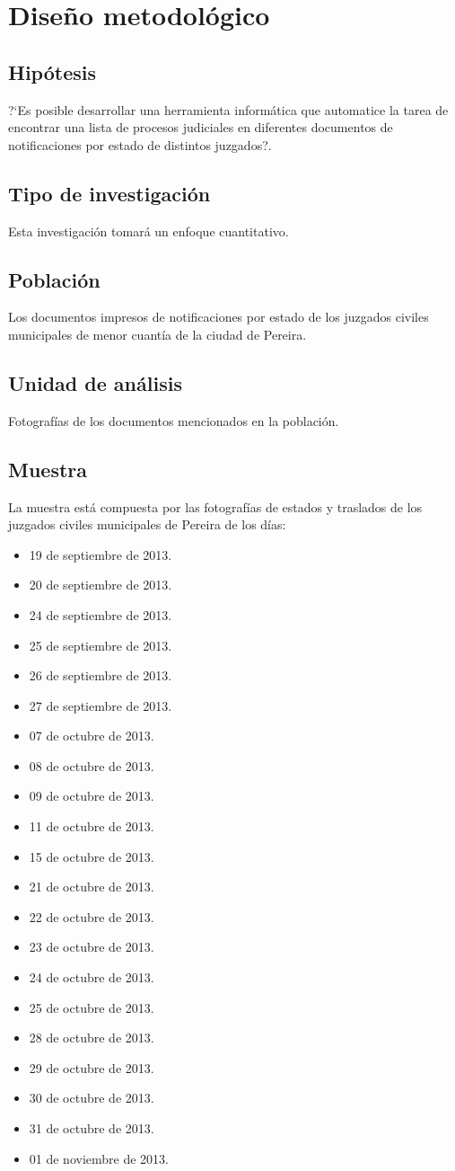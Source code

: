 \chapter{Dise\~no metodol\'ogico}
\label{sec:diseno}
\section{Hip\'otesis}
?`Es posible desarrollar una herramienta inform\'atica que automatice la 
tarea de encontrar una lista de procesos judiciales en diferentes documentos
de notificaciones por estado de distintos juzgados?.
\section{Tipo de investigaci\'on}
Esta investigaci\'on tomar\'a un enfoque cuantitativo.
\section{Poblaci\'on}
Los documentos impresos de notificaciones por estado de los juzgados civiles municipales de menor cuant\'ia de la ciudad de Pereira.
\section{Unidad de an\'alisis}
Fotograf\'ias de los documentos mencionados en la poblaci\'on.
\section{Muestra}
La muestra est\'a compuesta por las fotograf\'ias de estados y traslados de los juzgados civiles municipales de Pereira de los d\'ias:
\begin{itemize}
\item 19 de septiembre de 2013.
\item 20 de septiembre de 2013.
\item 24 de septiembre de 2013.
\item 25 de septiembre de 2013.
\item 26 de septiembre de 2013.
\item 27 de septiembre de 2013.
\item 07 de octubre de 2013.
\item 08 de octubre de 2013.
\item 09 de octubre de 2013.
\item 11 de octubre de 2013.
\item 15 de octubre de 2013.
\item 21 de octubre de 2013.
\item 22 de octubre de 2013.
\item 23 de octubre de 2013.
\item 24 de octubre de 2013.
\item 25 de octubre de 2013.
\item 28 de octubre de 2013.
\item 29 de octubre de 2013.
\item 30 de octubre de 2013.
\item 31 de octubre de 2013.
\item 01 de noviembre de 2013.

\end{itemize}
